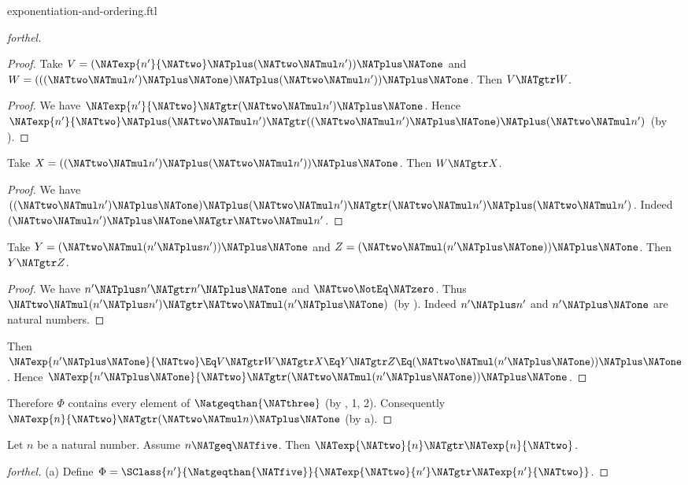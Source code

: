 \documentclass{stex}
\begin{document}
\begin{smodule}{exponentiation-and-ordering.ftl}
\begin{proof}[forthel]
\begin{proof}
    Take $V = (\NATexp{n'}{\NATtwo} \NATplus (\NATtwo \NATmul n')) \NATplus \NATone$ and $W = (((\NATtwo \NATmul n') \NATplus \NATone) \NATplus (\NATtwo \NATmul n')) \NATplus \NATone$.
    Then $V \NATgtr W$.
    \begin{proof}
      We have $\NATexp{n'}{\NATtwo} \NATgtr (\NATtwo \NATmul n') \NATplus \NATone$.
      Hence $\NATexp{n'}{\NATtwo} \NATplus (\NATtwo \NATmul n') \NATgtr ((\NATtwo \NATmul n') \NATplus \NATone) \NATplus (\NATtwo \NATmul n')$ (by ).
    \end{proof}

    Take $X = ((\NATtwo \NATmul n') \NATplus (\NATtwo \NATmul n')) \NATplus \NATone$.
    Then $W \NATgtr X$.
    \begin{proof}
      We have $((\NATtwo \NATmul n') \NATplus \NATone) \NATplus (\NATtwo \NATmul n') \NATgtr (\NATtwo \NATmul n') \NATplus (\NATtwo \NATmul n')$.
      Indeed $(\NATtwo \NATmul n') \NATplus \NATone \NATgtr \NATtwo \NATmul n'$.
    \end{proof}

    Take $Y = (\NATtwo \NATmul (n' \NATplus n')) \NATplus \NATone$ and $Z = (\NATtwo \NATmul (n' \NATplus \NATone)) \NATplus \NATone$.
    Then $Y \NATgtr Z$.
    \begin{proof}
      We have $n' \NATplus n' \NATgtr n' \NATplus \NATone$ and $\NATtwo \NotEq \NATzero$.
      Thus $\NATtwo \NATmul (n' \NATplus n') \NATgtr \NATtwo \NATmul (n' \NATplus \NATone)$ (by ).
      Indeed $n' \NATplus n'$ and $n' \NATplus \NATone$ are natural numbers.
    \end{proof}

    Then $\NATexp{n' \NATplus \NATone}{\NATtwo} \Eq V \NATgtr W \NATgtr X \Eq Y \NATgtr Z \Eq (\NATtwo \NATmul (n' \NATplus \NATone)) \NATplus \NATone$.
    Hence $\NATexp{n' \NATplus \NATone}{\NATtwo} \NATgtr (\NATtwo \NATmul (n' \NATplus \NATone)) \NATplus \NATone$.
  \end{proof}

  Therefore $\Phi$ contains every element of $\Natgeqthan{\NATthree}$ (by , 1, 2).
  Consequently $\NATexp{n}{\NATtwo} \NATgtr (\NATtwo \NATmul n) \NATplus \NATone$ (by a).
\end{proof}

\begin{proposition}[forthel,id=ARITHMETIC_09_1097950367318016]
  Let $n$ be a natural number.
  Assume $n \NATgeq \NATfive$.
  Then $\NATexp{\NATtwo}{n} \NATgtr \NATexp{n}{\NATtwo}$.
\end{proposition}
\begin{proof}[forthel]
  (a) Define $\Phi = \SClass{n'}{\Natgeqthan{\NATfive}}{\NATexp{\NATtwo}{n'} \NATgtr \NATexp{n'}{\NATtwo}}$.


\end{proof}
\end{smodule}
\end{document}
